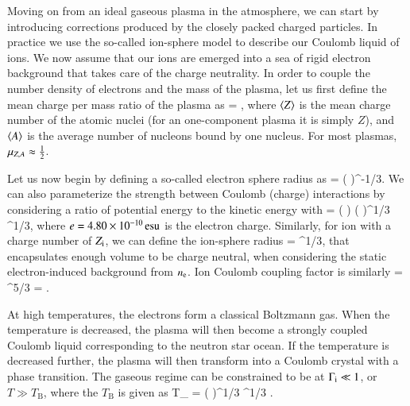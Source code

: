 Moving on from an ideal gaseous plasma in the atmosphere, we can start by introducing corrections produced by the closely packed charged particles.
In practice we use the so-called ion-sphere model to describe our Coulomb liquid of ions.
We now assume that our ions are emerged into a sea of rigid electron background that takes care of the charge neutrality.
In order to couple the number density of electrons and the mass of the plasma, let us first define the mean charge per mass ratio of the plasma as
\be
\Mu = ,
\ee
where $\langle Z \rangle$ is the mean charge number of the atomic nuclei (for an one-component plasma it is simply $Z$), and $\langle A \rangle$ is the average number of nucleons bound by one nucleus.
For most plasmas, $\mu_{Z,A} \approx \frac{1}{2}$.

Let us now begin by defining a so-called electron sphere radius as
\be
\erad = \left(  \right)^{-1/3}.
\ee
We can also parameterize the strength between Coulomb (charge) interactions by considering a ratio of potential energy to the kinetic energy with
\be
\Ge =   \left(  \right) \left(  \right)^{1/3} \Mu^{1/3},
\ee
where $e = 4.80 \times 10^{-10} \, \mathrm{esu}$ is the electron charge.
Similarly, for ion with a charge number of $Z_{\mathrm{i}}$, we can define the ion-sphere radius
\be
\irad = \erad \Zi^{1/3},
\ee
that encapsulates enough volume to be charge neutral, when considering the static electron-induced background from $n_{\mathrm{e}}$.
Ion Coulomb coupling factor is similarly
\be
\Gi = \Ge \Zi^{5/3} = .
\ee

At high temperatures, the electrons form a classical Boltzmann gas.
When the temperature is decreased, the plasma will then become a strongly coupled Coulomb liquid corresponding to the neutron star ocean.
If the temperature is decreased further, the plasma will then transform into a Coulomb crystal with a phase transition.
The gaseous regime can be constrained to be at $\Gamma_{\mathrm{i}} \ll 1$, or $T \gg T_{\mathrm{B}}$, where the $T_{\mathrm{B}}$ is given as
\be
T_{} =  \approx {} \left(  \right)^{1/3} \Mu^{1/3} \Kelvin.
\ee

